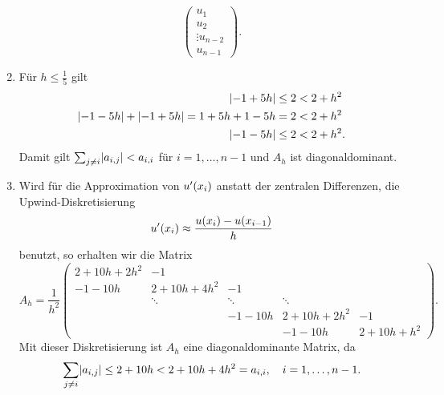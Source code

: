 \documentclass{exercise}
\begin{document}
\begin{enumerate}
\[\begin{pmatrix}
                u_1\\
                u_2\\
                \vdots
                u_{n - 2}\\
                u_{n - 1}
            \end{pmatrix}.
        \]
        \item Für \(h \le \frac{1}{5}\) gilt
        \begin{align*}
            \absolute*{-1 + 5h} \le 2 &< 2 + h^2\\
            \absolute*{-1 - 5h} + \absolute*{-1 + 5h} = 1 + 5h + 1 - 5h = 2 &< 2 + h^2\\
            \absolute*{-1 - 5h} \le 2 &< 2 + h^2.
        \end{align*}
        Damit gilt \(\sum_{j \ne i}\absolute*{a_{i, j}} < a_{i, i}\) für \(i = 1, \ldots, n - 1\) und \(A_h\) ist diagonaldominant.
        \item Wird für die Approximation von \(u'\parentheses*{x_i}\) anstatt der zentralen Differenzen, die Upwind-Diskretisierung
        \[
            u'\parentheses*{x_i} \approx \frac{u\parentheses*{x_i} - u\parentheses*{x_{i - 1}}}{h}
        \]
        benutzt, so erhalten wir die Matrix
        \[
            A_h = \frac{1}{h^2}\begin{pmatrix}
                2 + 10h + 2h^2 & -1\\
                -1 - 10h & 2 + 10h + 4h^2 & -1\\
                & \ddots & \ddots & \ddots\\
                & & -1 - 10h & 2 + 10h + 2h^2 & -1\\
                & & & -1 - 10h & 2 + 10h + h^2
            \end{pmatrix}.
        \]
        Mit dieser Diskretisierung ist \(A_h\) eine diagonaldominante Matrix, da
        \[
            \sum_{j \ne i}\absolute*{a_{i, j}} \le 2 + 10h < 2 + 10h + 4h^2 = a_{i, i}, \quad i = 1, \ldots, n - 1.
        \]
    \end{enumerate}
\end{document}
